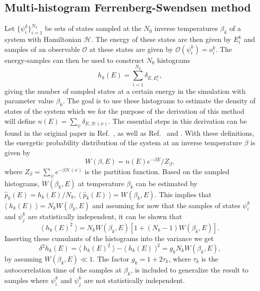 \subsection{Multi-histogram Ferrenberg-Swendsen method}

Let $\{\psi_i^k\}_{i=1}^{N_k}$ be sets of states sampled at the $N_0$ inverse temperatures $\beta_k$ of a system with Hamiltonian $\mathcal{H}$.
The energy of these states are then given by $E_i^k$ and samples of an observable $\mathcal{O}$ at these states are given by $\mathcal{O}(\psi_i^k) = o_i^k$.
The energy-samples can then be used to construct $N_0$ histograms
\begin{equation}
    \label{eq:Monte:Reweighting:MFS:interactedLnSum}
    h_k(E) = \sum_{i=1}^{N_k}\delta_{E,E_i^k},
\end{equation}
giving the number of sampled states at a certain energy in the simulation with parameter value $\beta_k$. The goal is to use these histograms to estimate the
density of states of the system which we for the purpose of the derivation of this method will define $n(E) = \sum_\psi\delta_{E,\mathcal{H}(\psi)}$.
The essential steps in this derivation can be found in the original paper in Ref.~\cite{FS_1989}, as well as Ref.~\cite{Newman99} and \cite{rummukainen}.
With these
definitions, the energetic probability distribution of the system at an inverse temperature $\beta$ is given by
\begin{equation}
    \label{eq:Monte:Reweighting:MFS:enProbDist}
    W(\beta,E) = n(E)e^{-\beta E}/Z_\beta,
\end{equation}
where $Z_\beta = \sum_\psi e^{-\beta\mathcal{H}(\psi)}$ is the partition function. Based on the sampled histograms, $W(\beta_k,E)$ at temperature $\beta_k$ can be estimated
by $\hat{p}_k(E) = h_k(E)/N_k$, \ie $\langle\;\hat{p}_k(E)\;\rangle = W(\beta_k,E)$. This implies that $\langle\;h_k(E)\;\rangle = N_kW(\beta_k,E)$ and assuming for now
that the samples of states $\psi_i^k$ and $\psi_j^k$ are statistically independent, it can be shown that 
\begin{equation}
    \label{eq:Monte:Reweighting:MFS:avgHistogramSquared}
    \langle\;h_k(E)^2\;\rangle = N_kW(\beta_k,E)[1 + (N_k-1)W(\beta_k,E)].
\end{equation}
Inserting these cumulants of the histograms into the variance we get
\begin{equation}
    \label{eq:Monte:Reweighting:MFS:histogramVariance}
    \delta^2h_k(E) = \langle\;h_k(E)^2\;\rangle - \langle\;h_k(E)\;\rangle^2 = g_kN_kW(\beta_k,E),
\end{equation}
by assuming $W(\beta_k,E)\ll1$. The factor $g_k = 1+2\tau_k$, where $\tau_k$ is the autocorrelation time of the samples at $\beta_k$, is included to generalize the result
to samples where $\psi_i^k$ and $\psi_j^k$ are not statistically independent.

